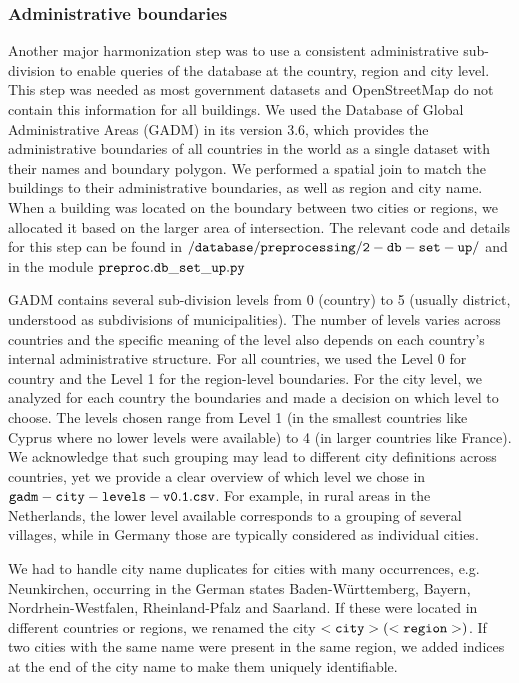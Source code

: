 \documentclass[fleqn,10pt]{wlscirep}
\begin{document}
\subsubsection*{Administrative boundaries}

Another major harmonization step was to use a consistent administrative sub-division to enable queries of the database at the country, region and city level. This step was needed as most government datasets and OpenStreetMap do not contain this information for all buildings. We used the Database of Global Administrative Areas (GADM) in its version 3.6, which provides the administrative boundaries of all countries in the world as a single dataset with their names and boundary polygon. We performed a spatial join to match the buildings to their administrative boundaries, as well as region and city name. When a building was located on the boundary between two cities or regions, we allocated it based on the larger area of intersection. The relevant code and details for this step can be found in $\tt{/database/preprocessing/2-db-set-up/}$ and in the module $\tt{preproc.db\_set\_up.py}$ \cite{eubucco-0.1-code2022}

GADM contains several sub-division levels from 0 (country) to 5 (usually district, understood as subdivisions of municipalities). The number of levels varies across countries and the specific meaning of the level also depends on each country's internal administrative structure. For all countries, we used the Level 0 for country and the Level 1 for the region-level boundaries. For the city level, we analyzed for each country the boundaries and made a decision on which level to choose. The levels chosen range from Level 1 (in the smallest countries like Cyprus where no lower levels were available) to 4 (in larger countries like France). We acknowledge that such grouping may lead to different city definitions across countries, yet we provide a clear overview of which level we chose in ${\tt gadm-city-levels-v0.1.csv}$. For example, in rural areas in the Netherlands, the lower level available corresponds to a grouping of several villages, while in Germany those are typically considered as individual cities. 

We had to handle city name duplicates for cities with many occurrences, e.g. Neunkirchen, occurring in the German states Baden-Württemberg, Bayern, Nordrhein-Westfalen, Rheinland-Pfalz and Saarland. If these were located in different countries or regions, we renamed the city $\tt{<city> (<region>)}$. If two cities with the same name were present in the same region, we added indices at the end of the city name to make them uniquely identifiable. 
\end{document}
